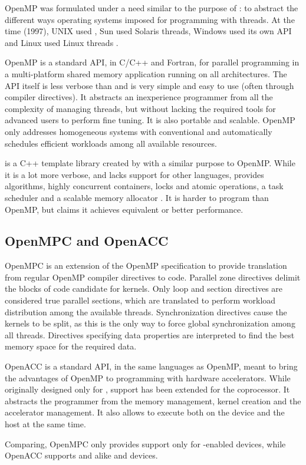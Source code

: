 \documentclass[../thesis]{subfiles}
\begin{document}
		OpenMP \cite{OpenMP,OpenMP:spec3.1} was formulated under a need similar to the purpose of \pthreads: to abstract the different ways operating systems imposed for programming with threads. At the time (1997), UNIX used \pthreads, Sun used Solaris threads, Windows used its own API and Linux used Linux threads \cite{Intel:pthreads_or_openmp}.

		OpenMP is a standard API, in C/C++ and Fortran, for parallel programming in a multi-platform shared memory application running on all architectures. The API itself is less verbose than \pthreads and is very simple and easy to use (often through compiler directives). It abstracts an inexperience programmer from all the complexity of managing threads, but without lacking the required tools for advanced users to perform fine tuning. It is also portable and scalable. OpenMP only addresses homogeneous systems with conventional \cpus and automatically schedules efficient workloads among all available resources.

		\intel\tbb is a C++ template library created by \intel with a similar purpose to OpenMP. While it is a lot more verbose, and lacks support for other languages, \tbb provides algorithms, highly concurrent containers, locks and atomic operations, a task scheduler and a scalable memory allocator \cite{TBB}. It is harder to program than OpenMP, but \intel claims it achieves equivalent or better performance.

		\subsection{OpenMPC and OpenACC}

		OpenMPC \cite{OpenMPC} is an extension of the OpenMP specification to provide translation from regular OpenMP compiler directives to \cuda code. Parallel zone directives delimit the blocks of code candidate for \cuda kernels. Only loop and section directives are considered true parallel sections, which are translated to perform workload distribution among the available threads. Synchronization directives cause the kernels to be split, as this is the only way to force global synchronization among all threads. Directives specifying data properties are interpreted to find the best \gpu memory space for the required data.

		OpenACC \cite{OpenACC:2.0} is a standard API, in the same languages as OpenMP, meant to bring the advantages of OpenMP to programming with hardware accelerators. While originally designed only for \gpus, support has been extended for the \intel\xeonphi coprocessor. It abstracts the programmer from the memory management, kernel creation and the accelerator management. It also allows to execute both on the device and the host at the same time.

		Comparing, OpenMPC only provides support only for \cuda-enabled devices, while OpenACC supports \nvidia and \amd\gpus alike and \intel\mic devices.
\end{document}
